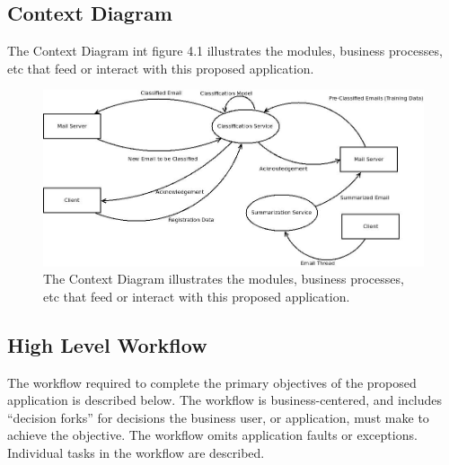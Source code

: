 \subsection{Context Diagram}
The Context Diagram int figure 4.1 illustrates the modules, business processes, etc that feed 
or interact with this proposed application.
\begin{figure}
  \centering
  \includegraphics[width=13cm]{context_diagram.jpeg}
  \caption[The Context Diagram illustrates the modules, business processes, etc that feed 
or interact with this proposed application.] {The Context Diagram illustrates the modules, business processes, etc that feed 
or interact with this proposed application.}
\end{figure}


\subsection{High Level Workflow}
The workflow required to complete the primary objectives of the proposed 
application is described below. The workflow is business-centered, and 
includes ``decision forks'' for decisions the business user, or application, 
must make to achieve the objective. The workflow omits application faults or exceptions. 
Individual tasks in the workflow are described.

